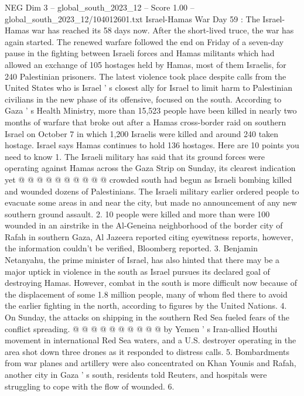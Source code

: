 \begin{textsample}{NEG Dim 3 – global\_south\_2023\_12 – Score 1.00 – global\_south\_2023\_12/104012601.txt}  \label{ex:f3_neg_015}
Israel-Hamas War Day 59 : The Israel-Hamas war has reached its 58 days now.
After the short-lived truce, the war has again started.
The renewed warfare followed the end on Friday of a seven-day pause in the fighting between Israeli forces and Hamas militants which had allowed an exchange of 105 hostages held by Hamas, most of them Israelis, for 240 Palestinian prisoners.
The latest violence took place despite calls from the United States who is Israel ' s closest ally for Israel to limit harm to Palestinian civilians in the new phase of its offensive, focused on the south.
According to Gaza ' s Health Ministry, more than 15,523 people have been killed in nearly two months of warfare that broke out after a Hamas cross-border raid on southern Israel on October 7 in which 1,200 Israelis were killed and around 240 taken hostage.
Israel says Hamas continues to hold 136 hostages.
Here are 10 points you need to know 1.
The Israeli military has said that its ground forces were operating against Hamas across the Gaza Strip on Sunday, its clearest indication yet @ @ @ @ @ @ @ @ @ @ crowded south had begun as Israeli bombing killed and wounded dozens of Palestinians.
The Israeli military earlier ordered people to evacuate some areas in and near the city, but made no announcement of any new southern ground assault. 2. 10 people were killed and more than were 100 wounded in an airstrike in the Al-Geneina neighborhood of the border city of Rafah in southern Gaza, Al Jazeera reported citing eyewitness reports, however, the information couldn't be verified, Bloomberg reported. 3.
Benjamin Netanyahu, the prime minister of Israel, has also hinted that there may be a major uptick in violence in the south as Israel pursues its declared goal of destroying Hamas.
However, combat in the south is more difficult now because of the displacement of some 1.8 million people, many of whom fled there to avoid the earlier fighting in the north, according to figures by the United Nations. 4.
On Sunday, the attacks on shipping in the southern Red Sea fueled fears of the conflict spreading. @ @ @ @ @ @ @ @ @ @ by Yemen ' s Iran-allied Houthi movement in international Red Sea waters, and a U.S. destroyer operating in the area shot down three drones as it responded to distress calls. 5.
Bombardments from war planes and artillery were also concentrated on Khan Younis and Rafah, another city in Gaza ' s south, residents told Reuters, and hospitals were struggling to cope with the flow of wounded. 6.

\end{textsample}
